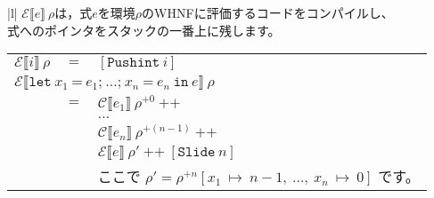 \documentclass{jarticle}
\begin{document}
\begin{tabular} {|l|} \hline
	$\mathcal{E} \llbracket e \rrbracket ~ \rho$は，式$e$を環境$\rho$のWHNFに評価するコードをコンパイルし、       \\
	式へのポインタをスタックの一番上に残します。                                                                  \\
	\begin{tabular}{r c l}
		$\mathcal{E} \llbracket i \rrbracket ~ \rho$                                                               & $=$ & $\left[\texttt{Pushint} ~ i \right]$                                                                                                                                                         \\
		\multicolumn{3}{l}{$\mathcal{E} \llbracket \texttt{let} ~ x_1 ~ \texttt{=} ~ e_1\texttt{;} ~  \ldots \texttt{;} ~ x_n ~ \texttt{=} ~ e_n ~ \texttt{in} ~ e \rrbracket ~ \rho$}                                                                                                                                  \\
		                                                                                                           & $=$ & $\mathcal{C} \llbracket e_1 \rrbracket ~ \rho^{+0} ~ \texttt{++}$                                                                                                                            \\
		                                                                                                           &     & $\ldots$                                                                                                                                                                                     \\
		                                                                                                           &     & $\mathcal{C} \llbracket e_n \rrbracket ~ \rho^{+(n - 1)} ~ \texttt{++}$                                                                                                                      \\
		                                                                                                           &     & $\mathcal{E} \llbracket e \rrbracket ~ \rho' ~ \texttt{++} ~ \left[\texttt{Slide} ~ n\right]$                                                                                                \\
		                                                                                                           &     & ここで $\rho' = \rho^{+n} \left[x_1 ~ \mapsto ~ n - 1, ~ \ldots , ~ x_n ~ \mapsto ~ 0\right]$ です。                                                                                         \\

\end{tabular}
\end{tabular}
\end{document}
